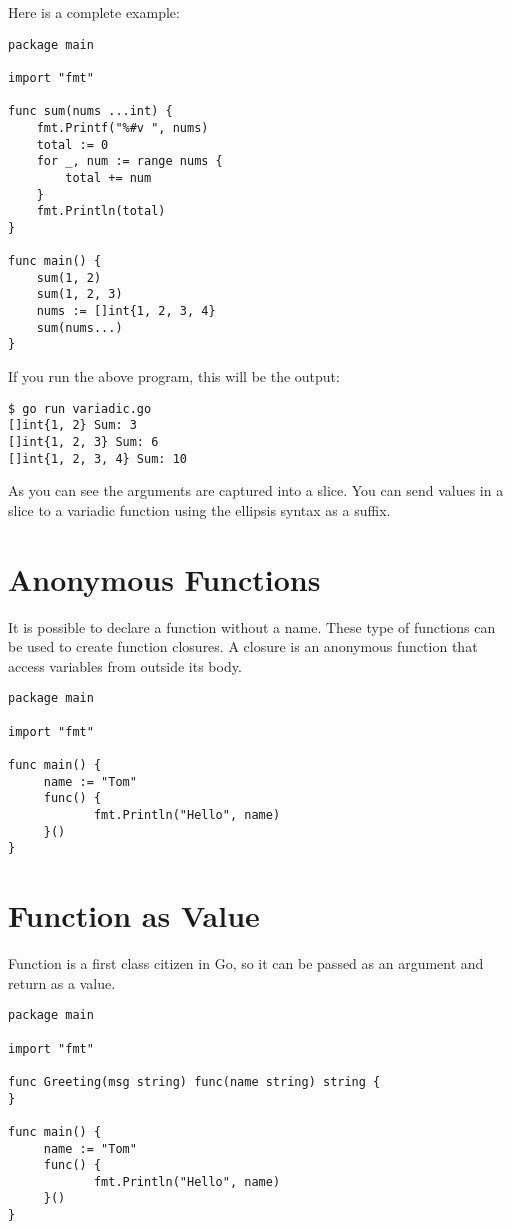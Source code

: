 Here is a complete example:

\begin{lstlisting}
package main

import "fmt"

func sum(nums ...int) {
    fmt.Printf("%#v ", nums)
    total := 0
    for _, num := range nums {
        total += num
    }
    fmt.Println(total)
}

func main() {
    sum(1, 2)
    sum(1, 2, 3)
    nums := []int{1, 2, 3, 4}
    sum(nums...)
}
\end{lstlisting}

If you run the above program, this will be the output:

\begin{lstlisting}[numbers=none]
$ go run variadic.go
[]int{1, 2} Sum: 3
[]int{1, 2, 3} Sum: 6
[]int{1, 2, 3, 4} Sum: 10
\end{lstlisting}

As you can see the arguments are captured into a slice.  You can send
values in a slice to a variadic function using the ellipsis syntax as
a suffix.

\section{Anonymous Functions}

It is possible to declare a function without a
name.  These type of functions can be used
to create function closures.  A closure is an anonymous function that
access variables from outside its body.

\begin{lstlisting}
package main

import "fmt"

func main() {
     name := "Tom"
     func() {
            fmt.Println("Hello", name)
     }()
}
\end{lstlisting}

\section{Function as Value}

Function is a first class citizen in Go, so it
can be passed as an argument and return as a value.

\begin{lstlisting}
package main

import "fmt"

func Greeting(msg string) func(name string) string {
}

func main() {
     name := "Tom"
     func() {
            fmt.Println("Hello", name)
     }()
}
\end{lstlisting}

